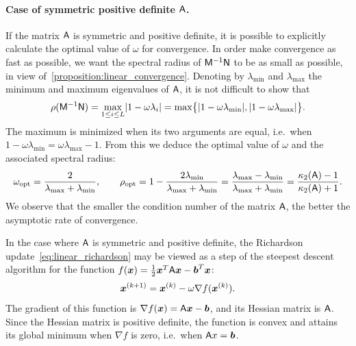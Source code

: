 \paragraph{Case of symmetric positive definite $\mathsf A$.}%
\label{par:case_of_symmetric_positive_definite_mat_a_}
If the matrix $\mathsf A$ is symmetric and positive definite,
it is possible to explicitly calculate the optimal value of $\omega$ for convergence.
In order make convergence as fast as possible,
we want the spectral radius of $\mathsf M^{-1} \mathsf N$ to be as small as possible,
in view of~\cref{proposition:linear_convergence}.
Denoting by $\lambda_{\min}$ and $\lambda_{\max}$ the minimum and maximum eigenvalues of $\mathsf A$,
it is not difficult to show that
\[
    \rho(\mathsf M^{-1} \mathsf N)
    = \max_{1 \leq i \leq L} \lvert1  - \omega \lambda_i\rvert
    = \max \bigl\{ \lvert1 - \omega \lambda_{\min}\rvert, \lvert1 - \omega \lambda_{\max}\rvert\bigr\}.
\]
The maximum is minimized when its two arguments are equal,
i.e.\ when $1 - \omega \lambda_{\min} = \omega \lambda_{\max} -1$.
From this we deduce the optimal value of $\omega$ and the associated spectral radius:
\[
    \omega_{\rm opt} = \frac{2}{\lambda_{\max} + \lambda_{\min}},
    \qquad
    \rho_{\rm opt}
    = 1 - \frac{2\lambda_{\min}}{\lambda_{\max} + \lambda_{\min}}
    = \frac{\lambda_{\max} - \lambda_{\min}}{\lambda_{\max} + \lambda_{\min}}
    =  \frac{\kappa_2(\mathsf A) - 1}{\kappa_2(\mathsf A) + 1}.
\]
We observe that the smaller the condition number of the matrix $\mathsf A$,
the better the asymptotic rate of convergence.

\begin{remark}
    In the case where $\mathsf A$ is symmetric and positive definite,
    the Richardson update~\eqref{eq:linear_richardson} may be viewed as a step of the steepest descent algorithm
    for the function $f(\mathbf{\boldsymbol{x}}) = \frac{1}{2} \mathbf{\boldsymbol{x}}^T \mathsf A \mathbf{\boldsymbol{x}} - \mathbf{\boldsymbol{b}}^T \mathbf{\boldsymbol{x}}$:
    \begin{equation}
        \label{eq:linear_richardson_gradient}
        \mathbf{\boldsymbol{x}}^{(k+1)} = \mathbf{\boldsymbol{x}}^{(k)} - \omega \nabla f(\mathbf{\boldsymbol{x}}^{(k)}).
    \end{equation}
    The gradient of this function is $\nabla f(\mathbf{\boldsymbol{x}}) = \mathsf A \mathbf{\boldsymbol{x}} - \mathbf{\boldsymbol{b}}$,
    and its Hessian matrix is $\mathsf A$.
    Since the Hessian matrix is positive definite, the function is convex
    and attains its global minimum when $\nabla f$ is zero,
    i.e.\ when $\mathsf A x = \mathbf{\boldsymbol{b}}$.
\end{remark}

